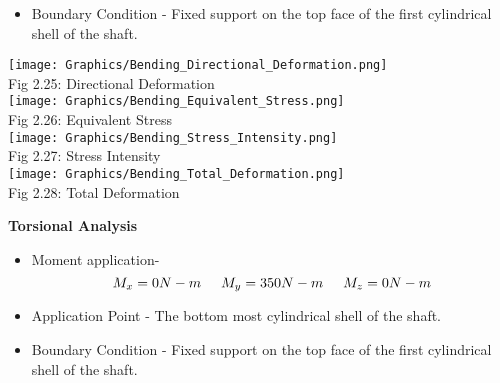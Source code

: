 \documentclass[a4,10pt]{report}
\begin{document}
\begin{enumerate}
\begin{itemize}
\item Boundary Condition - Fixed support on the top face of the first cylindrical shell of the shaft.
\end{itemize}
\begin{center}
     \texttt{[image: Graphics/Bending\_Directional\_Deformation.png]} \\
     \normalsize{Fig 2.25: Directional Deformation} \\
     \vspace{2mm}
     \texttt{[image: Graphics/Bending\_Equivalent\_Stress.png]} \\
     \normalsize{Fig 2.26: Equivalent Stress} \\  
     \vspace{10mm}
     \texttt{[image: Graphics/Bending\_Stress\_Intensity.png]} \\
     \normalsize{Fig 2.27: Stress Intensity} \\
     \vspace{10mm}
     \texttt{[image: Graphics/Bending\_Total\_Deformation.png]} \\
     \normalsize{Fig 2.28: Total Deformation} \\
\end{center}


\textbf{Torsional Analysis} \\ 

\begin{itemize}
 \item Moment application-
 \[ M_{x} = 0  N-m  \hspace{0.5cm} M_{y} = 350 N-m \hspace{0.5cm} M_{z} = 0 N-m \]

\item Application Point - The bottom most cylindrical shell of the shaft.

\item Boundary Condition - Fixed support on the top face of the first cylindrical shell of the shaft.
\end{itemize}



\end{enumerate}
\end{document}
